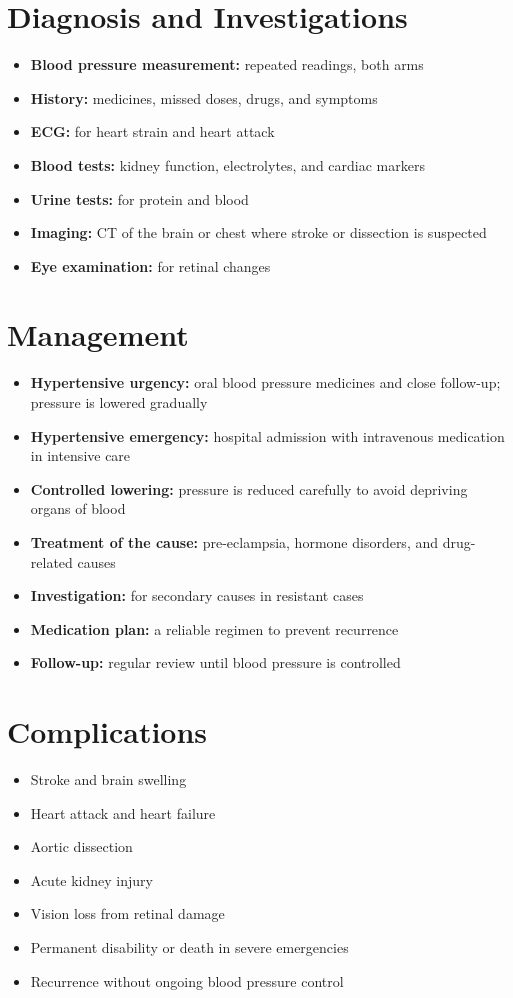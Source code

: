 \section*{Diagnosis and Investigations}
\begin{itemize}
    \item \textbf{Blood pressure measurement:} repeated readings, both arms
    \item \textbf{History:} medicines, missed doses, drugs, and symptoms
    \item \textbf{ECG:} for heart strain and heart attack
    \item \textbf{Blood tests:} kidney function, electrolytes, and cardiac markers
    \item \textbf{Urine tests:} for protein and blood
    \item \textbf{Imaging:} CT of the brain or chest where stroke or dissection is suspected
    \item \textbf{Eye examination:} for retinal changes
\end{itemize}

\section*{Management}
\begin{itemize}
    \item \textbf{Hypertensive urgency:} oral blood pressure medicines and close follow-up; pressure is lowered gradually
    \item \textbf{Hypertensive emergency:} hospital admission with intravenous medication in intensive care
    \item \textbf{Controlled lowering:} pressure is reduced carefully to avoid depriving organs of blood
    \item \textbf{Treatment of the cause:} pre-eclampsia, hormone disorders, and drug-related causes
    \item \textbf{Investigation:} for secondary causes in resistant cases
    \item \textbf{Medication plan:} a reliable regimen to prevent recurrence
    \item \textbf{Follow-up:} regular review until blood pressure is controlled
\end{itemize}

\section*{Complications}
\begin{itemize}
    \item Stroke and brain swelling
    \item Heart attack and heart failure
    \item Aortic dissection
    \item Acute kidney injury
    \item Vision loss from retinal damage
    \item Permanent disability or death in severe emergencies
    \item Recurrence without ongoing blood pressure control
\end{itemize}

